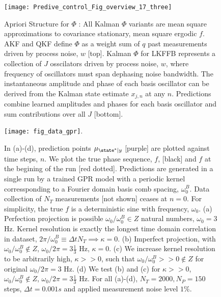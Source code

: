 \clearpage \newpage 

\begin{figure} [h]
    \texttt{[image: Predive\_control\_Fig\_overview\_17\_three]}
    \caption{\label{Predive_control_Fig_overview_17_three} Apriori Structure for $\Phi$ : All Kalman $\Phi$ variants are mean square approximations to covariance stationary, mean square ergodic $f$. AKF and QKF define $\Phi$ as a weight sum of $q$ past measurements driven by process noise, $w$ [top]. Kalman $\Phi$ for LKFFB represents a collection of $J$ osscilators driven by process noise, $w$, where frequency of oscillators must span dephasing noise bandwidth. The instantaneous amplitude and phase of each basis oscillator can be derived from the Kalman state estimate $x_{j, n}$ at any $n$. Predictions combine learned amplitudes and phases for each basis oscillator and sum contributions over all $J$ [bottom].}
\end{figure}

\clearpage \newpage


\begin{figure}
    \texttt{[image: fig\_data\_gpr]}. 
    \caption{\label{fig:main:fig_data_gpr} In (a)-(d), prediction points $\mu_{\state^*|y}$ [purple] are plotted against time steps, $n$. We plot the true phase sequence,  $f$, [black] and  $f$ at the begining of the run [red dotted]. Predictions are generated in a single run by a trained GPR model with a periodic kernel corressponding to a Fourier domain basis comb spacing, $\omega_0^B$. Data collection of $N_T$ measurements [not shown] ceases at $n=0$. For simplicity, the true $f$ is a deterministic sine with frequency, $\omega_0$. (a) Perfection projection is possible $\omega_0 / \omega_0^B \in Z$ natural numbers, $\omega_0 = 3$ Hz. Kernel resolution is exactly the longest time domain correlation in dataset, $2 \pi / \omega_0^B \equiv \Delta t N_T \implies \kappa = 0$.   (b) Imperfect projection, with $\omega_0 / \omega_0^B \notin Z$, $\omega_0 / 2 \pi = 3 \frac{1}{3}$ Hz, $\kappa=0$. (c) We increase kernel resolution to be arbitrarily high, $\kappa >> 0 $, such that $\omega_0 / \omega_0^B >> 0 \notin Z $ for original $ \omega_0 / 2 \pi = 3$ Hz. (d) We test (b) and (c) for $\kappa >>0$, $ \omega_0 / \omega_0^B \notin Z$, $\omega_0 / 2 \pi = 3 \frac{1}{3}$ Hz. For all (a)-(d), $N_T = 2000, N_P = 150$ steps, $\Delta t = 0.001s$ and applied measurement noise level $1\%$.} 
\end{figure}

\clearpage \newpage

